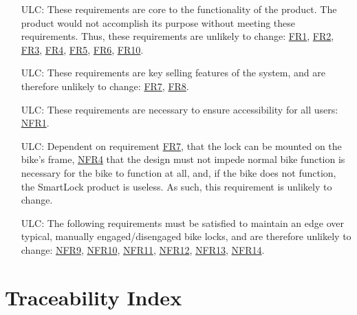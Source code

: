 \documentclass[12pt]{article}
\newcounter{lcnum} %
\newcounter{ulcnum} %
\begin{document}
\noindent \begin{itemize}

\item[ULC\refstepcounter{ulcnum}\theulcnum\label{LC_meaningfulLabel}:] These requirements are core to the functionality of the product. The product would not accomplish its purpose without meeting these requirements. Thus, these requirements are  unlikely to change: \hyperref[FRDisengage]{FR1}, \hyperref[FRLockStatusEngaged]{FR2}, \hyperref[FRLockStatusDisengaged]{FR3}, \hyperref[FRUserPos]{FR4}, \hyperref[FRSturdy]{FR5}, \hyperref[FRCorrectUser]{FR6}, \hyperref[FRPower]{FR10}.
\item[ULC\refstepcounter{ulcnum}\theulcnum\label{LC_meaningfulLabel}:] These requirements are key selling features of the system, and are therefore unlikely to change: \hyperref[FRBikeFrame]{FR7}, \hyperref[FRBatteryLevelDisplay]{FR8}.
\item[ULC\refstepcounter{ulcnum}\theulcnum\label{LC_meaningfulLabel}:] These requirements are necessary to ensure accessibility for all users: \hyperref[NFRInst]{NFR1}.
\item[ULC\refstepcounter{ulcnum}\theulcnum\label{LC_meaningfulLabel}:] Dependent on requirement \hyperref[FRBikeFrame]{FR7}, that the lock can be mounted on the bike's frame, \hyperref[NFRFunc]{NFR4} that the design must not impede normal bike function is necessary for the bike to function at all, and, if the bike does not function, the SmartLock product is useless. As such, this requirement is unlikely to change.
\item[ULC\refstepcounter{ulcnum}\theulcnum\label{LC_meaningfulLabel}:] The following requirements must be satisfied to maintain an edge over typical, manually engaged/disengaged bike locks, and are therefore unlikely to change: \hyperref[NFRCompQuick]{NFR9}, \hyperref[NFRCompForce]{NFR10}, \hyperref[NFRBatteryLife]{NFR11},  \hyperref[NFRBatteryAccess]{NFR12}, \hyperref[NFRTools]{NFR13}, \hyperref[NFRModels]{NFR14}.

\end{itemize}

\section{Traceability Index}
\end{document}
